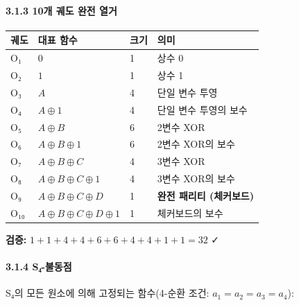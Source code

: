 \documentclass[
]{article}
\newcounter{none} %
\begin{document}
\paragraph{3.1.3 10개 궤도 완전
열거}\label{uxac1c-uxada4uxb3c4-uxc644uxc804-uxc5f4uxac70}

{\def\LTcaptype{none} %
\begin{longtable}[]{@{}llll@{}}
\toprule\noalign{}
궤도 & 대표 함수 & 크기 & 의미 \\
\midrule\noalign{}
\endhead
\bottomrule\noalign{}
\endlastfoot
O₁ & \(0\) & 1 & 상수 0 \\
O₂ & \(1\) & 1 & 상수 1 \\
O₃ & \(A\) & 4 & 단일 변수 투영 \\
O₄ & \(A \oplus 1\) & 4 & 단일 변수 투영의 보수 \\
O₅ & \(A \oplus B\) & 6 & 2변수 XOR \\
O₆ & \(A \oplus B \oplus 1\) & 6 & 2변수 XOR의 보수 \\
O₇ & \(A \oplus B \oplus C\) & 4 & 3변수 XOR \\
O₈ & \(A \oplus B \oplus C \oplus 1\) & 4 & 3변수 XOR의 보수 \\
O₉ & \(A \oplus B \oplus C \oplus D\) & 1 & \textbf{완전 패리티
(체커보드)} \\
O₁₀ & \(A \oplus B \oplus C \oplus D \oplus 1\) & 1 & 체커보드의 보수 \\
\end{longtable}
}

\textbf{검증:} \(1+1+4+4+6+6+4+4+1+1 = 32\) ✓

\paragraph{3.1.4 S₄-불동점}\label{sux2084-uxbd88uxb3d9uxc810}

S₄의 모든 원소에 의해 고정되는 함수(4-순환 조건:
\(a_1 = a_2 = a_3 = a_4\)):
\end{document}
